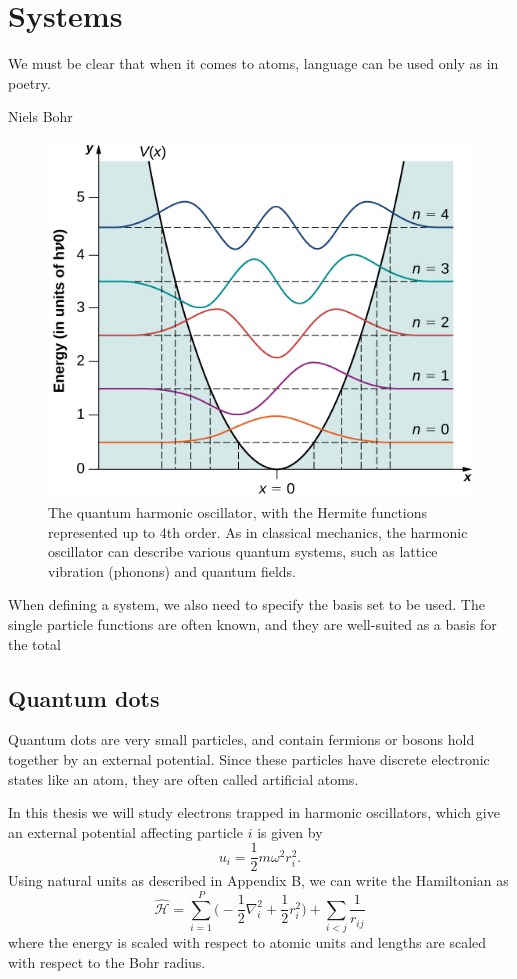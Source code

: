 \chapter{Systems} \label{chp:systems}
\epigraph{We must be clear that when it comes to atoms, language can be used only as in poetry.}{Niels Bohr}
\begin{figure}[H]
	\centering
	\label{fig:harmonicoscillator}
	\captionsetup[subfigure]{labelformat=empty}
	\includegraphics[scale=0.9]{Images/qho.jpg}
	\caption{The quantum harmonic oscillator, with the Hermite functions represented up to 4th order. As in classical mechanics, the harmonic oscillator can describe various quantum systems, such as lattice vibration (phonons) and quantum fields.}
\end{figure}

When defining a system, we also need to specify the basis set to be used. The single particle functions are often known, and they are well-suited as a basis for the total

\section{Quantum dots} \label{subsubsec:quantumdots}
Quantum dots are very small particles, and contain fermions or bosons hold together by an external potential. Since these particles have discrete electronic states like an atom, they are often called artificial atoms. 

In this thesis we will study electrons trapped in harmonic oscillators, which give an external potential affecting particle $i$ is given by
\begin{equation}
u_i=\frac{1}{2}m\omega^2r_i^2.
\end{equation}
Using natural units as described in Appendix B, we can write the Hamiltonian as
\begin{equation}
\label{eq:HOHamiltonian}
\hat{\mathcal{H}} = \sum_{i=1}^{P} \Big(-\frac{1}{2} \nabla_i^2 + \frac{1}{2} r_i ^2\Big) + \sum_{i<j} \frac{1}{r_{ij}} 
\end{equation}
where the energy is scaled with respect to atomic units and lengths are scaled with respect to the Bohr radius.

